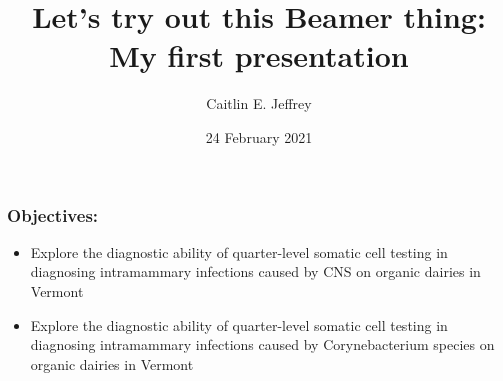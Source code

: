 \documentclass[12pt]{beamer}
\title[Beamer talk]{Let's try out this Beamer thing: My first presentation} %
\author{Caitlin E. Jeffrey} %
\institute[UVM] %
{
University of Vermont \\ %
Department of Animal and Veterinary Science \\
Burlington, VT 05401 USA \\ 
\medskip
\textit{caitlin.jeffrey@uvm.edu} %
}
\date{24 February 2021} %
\begin{document}


\begin{frame}
\titlepage %
\end{frame}


% 
% 


\begin{frame}
\frametitle{Objectives:}
\begin{itemize}
\item<1-> Explore the diagnostic ability of quarter-level somatic cell testing in diagnosing intramammary infections caused by CNS on organic dairies in Vermont
\item<2-> Explore the diagnostic ability of quarter-level somatic cell testing in diagnosing intramammary infections caused by Corynebacterium species on organic dairies in Vermont
\end{itemize}
\end{frame} 
\end{document}
